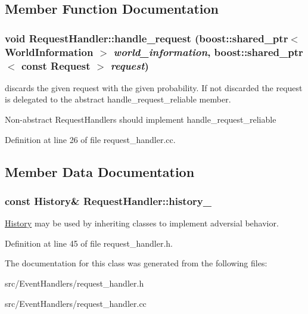 \subsection{Member Function Documentation}
\hypertarget{class_request_handler_8f5f5cd120fdfa9774ea2e5f7886a908}{
\subsubsection[handle\_\-request]{\setlength{\rightskip}{0pt plus 5cm}void RequestHandler::handle\_\-request (boost::shared\_\-ptr$<$ {\bf WorldInformation} $>$ {\em world\_\-information}, \/  boost::shared\_\-ptr$<$ const {\bf Request} $>$ {\em request})}}
\label{class_request_handler_8f5f5cd120fdfa9774ea2e5f7886a908}


discards the given request with the given probability. If not discarded the request is delegated to the abstract handle\_\-request\_\-reliable member.

Non-abstract RequestHandlers should implement handle\_\-request\_\-reliable 

Definition at line 26 of file request\_\-handler.cc.

\subsection{Member Data Documentation}
\hypertarget{class_request_handler_a046537a35694efb8a288ed0b0283442}{
\subsubsection[history\_\-]{\setlength{\rightskip}{0pt plus 5cm}const {\bf History}\& {\bf RequestHandler::history\_\-}}}
\label{class_request_handler_a046537a35694efb8a288ed0b0283442}


\hyperlink{class_history}{History} may be used by inheriting classes to implement adversial behavior. 

Definition at line 45 of file request\_\-handler.h.

The documentation for this class was generated from the following files:\begin{CompactItemize}
\item 
src/EventHandlers/request\_\-handler.h\item 
src/EventHandlers/request\_\-handler.cc\end{CompactItemize}
